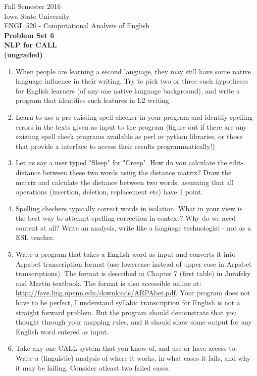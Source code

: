 \documentclass[11pt,a4paper]{article}
\begin{document}
\begin{center}
  Fall Semester 2016 \\ Iowa State University\\[3ex]
  {\large ENGL 520 - Computational Analysis of English}\\[3ex]
  \textbf{Problem Set 6} \\ \textbf{NLP for CALL \\ (ungraded)}
\end{center}

\begin{enumerate}
\item When people are learning a second language, they may still have some native language influence in their writing. Try to pick two or three such hypotheses for English learners (of any one native language background), and write a program that identifies such features in L2 writing.
\item Learn to use a pre-existing spell checker in your program and identify spelling errors in the texts given as input to the program (figure out if there are any existing spell check programs available as perl or python libraries, or those that provide a interface to access their results programmatically!)
\item Let us say a user typed "Sleep" for "Creep". How do you calculate the edit-distance between these two words using the distance matrix? Draw the matrix and calculate the distance between two words, assuming that all operations (insertion, deletion, replacement etc) have 1 point.
\item Spelling checkers typically correct words in isolation. What in your view is the best way to attempt spelling correction in context? Why do we need context at all? Write an analysis, write like a language technologist - not as a ESL teacher.
\item Write a program that takes a English word as input and converts it into Arpabet transcription format (use lowercase instead of upper case in Arpabet transcriptions). The format is described in Chapter 7 (first table) in Jurafsky and Martin textbook. The format is also accessible online at: \url{http://fave.ling.upenn.edu/downloads/ARPAbet.pdf}. Your program does not have to be perfect, I understand syllabic transcription for English is not a straight forward problem. But the program should demonstrate that you thought through your mapping rules, and it should show some output for any English word entered as input.  
\item Take any one CALL system that you know of, and use or have access to. Write a (linguistic) analysis of where it works, in what cases it fails, and why it may be failing. Consider atleast two failed cases.

\end{enumerate}
\end{document}

